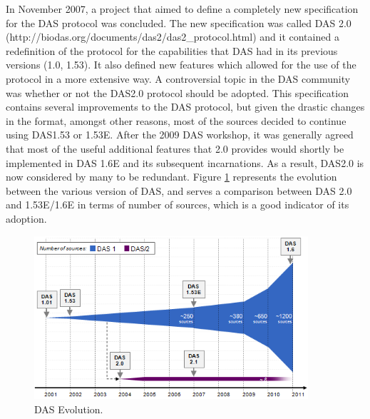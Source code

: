 In November 2007, a project that aimed to define a completely new specification for the DAS protocol was concluded. The new specification was called DAS 2.0 (http://biodas.org/documents/das2/das2\_protocol.html) and it contained a redefinition of the protocol for the capabilities that DAS had in its previous versions (1.0, 1.53). It also defined new features which allowed for the use of the protocol in a more extensive way. A controversial topic in the DAS community was whether or not the DAS2.0 protocol should be adopted. This specification contains several improvements to the DAS protocol, but given the drastic changes in the format, amongst other reasons, most of the sources decided to continue using DAS1.53 or 1.53E. After the 2009 DAS workshop, it was generally agreed that most of the useful additional features that 2.0 provides would shortly be implemented in DAS 1.6E and its subsequent incarnations. As a result, DAS2.0 is now considered by many to be redundant. Figure \ref{fig:dasevolution} represents the evolution between the various version of DAS, and serves a comparison between DAS 2.0 and 1.53E/1.6E in terms of number of sources, which is a good indicator of its adoption.

\begin{figure}  
\centering
\includegraphics[width=4in]{figures/DasEvolution2.PNG}
\caption[DAS Evolution.]{DAS Evolution.
\label{fig:dasevolution}}
\end{figure}


